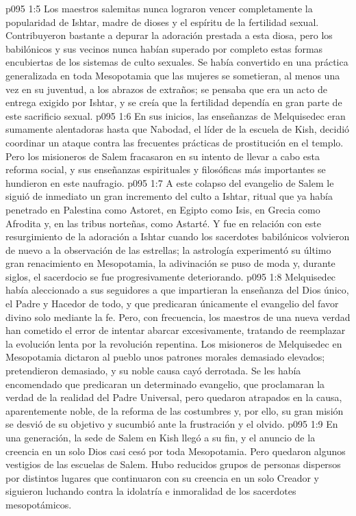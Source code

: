 \vs p095 1:5 Los maestros salemitas nunca lograron vencer completamente la popularidad de Ishtar, madre de dioses y el espíritu de la fertilidad sexual. Contribuyeron bastante a depurar la adoración prestada a esta diosa, pero los babilónicos y sus vecinos nunca habían superado por completo estas formas encubiertas de los sistemas de culto sexuales. Se había convertido en una práctica generalizada en toda Mesopotamia que las mujeres se sometieran, al menos una vez en su juventud, a los abrazos de extraños; se pensaba que era un acto de entrega exigido por Ishtar, y se creía que la fertilidad dependía en gran parte de este sacrificio sexual.
\vs p095 1:6 \pc En sus inicios, las enseñanzas de Melquisedec eran sumamente alentadoras hasta que Nabodad, el líder de la escuela de Kish, decidió coordinar un ataque contra las frecuentes prácticas de prostitución en el templo. Pero los misioneros de Salem fracasaron en su intento de llevar a cabo esta reforma social, y sus enseñanzas espirituales y filosóficas más importantes se hundieron en este naufragio.
\vs p095 1:7 A este colapso del evangelio de Salem le siguió de inmediato un gran incremento del culto a Ishtar, ritual que ya había penetrado en Palestina como Astoret, en Egipto como Isis, en Grecia como Afrodita y, en las tribus norteñas, como Astarté. Y fue en relación con este resurgimiento de la adoración a Ishtar cuando los sacerdotes babilónicos volvieron de nuevo a la observación de las estrellas; la astrología experimentó su último gran renacimiento en Mesopotamia, la adivinación se puso de moda y, durante siglos, el sacerdocio se fue progresivamente deteriorando.
\vs p095 1:8 Melquisedec había aleccionado a sus seguidores a que impartieran la enseñanza del Dios único, el Padre y Hacedor de todo, y que predicaran únicamente el evangelio del favor divino solo mediante la fe. Pero, con frecuencia, los maestros de una nueva verdad han cometido el error de intentar abarcar excesivamente, tratando de reemplazar la evolución lenta por la revolución repentina. Los misioneros de Melquisedec en Mesopotamia dictaron al pueblo unos patrones morales demasiado elevados; pretendieron demasiado, y su noble causa cayó derrotada. Se les había encomendado que predicaran un determinado evangelio, que proclamaran la verdad de la realidad del Padre Universal, pero quedaron atrapados en la causa, aparentemente noble, de la reforma de las costumbres y, por ello, su gran misión se desvió de su objetivo y sucumbió ante la frustración y el olvido.
\vs p095 1:9 En una generación, la sede de Salem en Kish llegó a su fin, y el anuncio de la creencia en un solo Dios casi cesó por toda Mesopotamia. Pero quedaron algunos vestigios de las escuelas de Salem. Hubo reducidos grupos de personas dispersos por distintos lugares que continuaron con su creencia en un solo Creador y siguieron luchando contra la idolatría e inmoralidad de los sacerdotes mesopotámicos.

